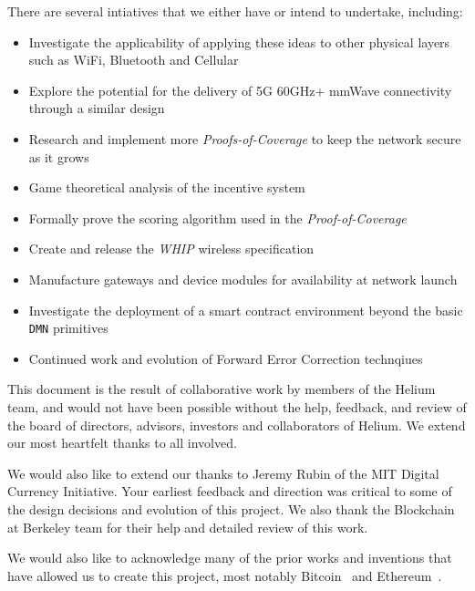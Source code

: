 \documentclass[10pt, nonatbib, nocopyrightspace, reprint]{sigplanconf}
\begin{document}
There are several intiatives that we either have or intend to undertake, including:

\begin{itemize}
    \item Investigate the applicability of applying these ideas to other physical layers such as WiFi, Bluetooth and Cellular
    \item Explore the potential for the delivery of 5G 60GHz+ mmWave connectivity through a similar design
    \item Research and implement more \emph{Proofs-of-Coverage} to keep the network secure as it grows
    \item Game theoretical analysis of the incentive system
    \item Formally prove the scoring algorithm used in the \emph{Proof-of-Coverage}
    \item Create and release the \emph{WHIP} wireless specification
    \item Manufacture gateways and device modules for availability at network launch
    \item Investigate the deployment of a smart contract environment beyond the basic \verb|DMN| primitives
    \item Continued work and evolution of Forward Error Correction technqiues
\end{itemize}

\acks

This document is the result of collaborative work by members of the Helium team, and would not have been possible without the help, feedback, and review of the board of directors, advisors, investors and collaborators of Helium. We extend our most heartfelt thanks to all involved.

We would also like to extend our thanks to Jeremy Rubin of the MIT Digital Currency Initiative. Your earliest feedback and direction was critical to some of the design decisions and evolution of this project. We also thank the Blockchain at Berkeley team for their help and detailed review of this work.

We would also like to acknowledge many of the prior works and inventions that have allowed us to create this project, most notably Bitcoin~\cite{bitcoin} and Ethereum~\cite{ethereum}.
\newpage
\end{document}

